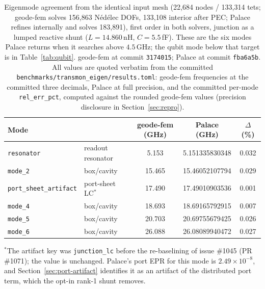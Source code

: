 \documentclass{anvil-paper}
\begin{document}
\begin{table}[t]
  \centering
  \caption{Eigenmode agreement from the identical input mesh (22{,}684
  nodes / 133{,}314 tets; geode-fem solves 156{,}863 N\'ed\'elec DOFs,
  133{,}108 interior after PEC; Palace refines internally and solves
  183{,}891), first order in both solvers, junction as a lumped reactive
  shunt ($L = 14.860$\,nH, $C = 5.5$\,fF). These are the six modes
  Palace returns when it searches above $4.5$\,GHz; the qubit mode below
  that target is in Table~\ref{tab:qubit}. geode-fem at commit
  \texttt{3174015}; Palace at commit \texttt{fba6a5b}. All values are
  quoted verbatim from the committed
  \texttt{benchmarks/transmon\_eigen/results.toml}: geode-fem frequencies
  at the committed three decimals, Palace at full precision, and the
  committed per-mode \texttt{rel\_err\_pct}, computed against the rounded
  geode-fem values (precision disclosure in Section~\ref{sec:repro}).}
  \label{tab:agreement}
  \small
  \begin{tabular}{@{}llccc@{}}
    \toprule
    Mode & & geode-fem (GHz) & Palace (GHz) & $\Delta$ (\%) \\
    \midrule
    \texttt{resonator} & readout resonator & 5.153 & 5.151335830348 & 0.032 \\
    \texttt{mode\_2} & box/cavity & 15.465 & 15.46052107794 & 0.029 \\
    \texttt{port\_sheet\_artifact} & port-sheet LC$^{\ast}$ & 17.490 & 17.49010903536 & 0.001 \\
    \texttt{mode\_4} & box/cavity & 18.693 & 18.69165792915 & 0.007 \\
    \texttt{mode\_5} & box/cavity & 20.703 & 20.69755679425 & 0.026 \\
    \texttt{mode\_6} & box/cavity & 26.088 & 26.08089940472 & 0.027 \\
    \bottomrule
  \end{tabular}

  \smallskip
  {\footnotesize $^{\ast}$The artifact key was \texttt{junction\_lc}
  before the re-baselining of issue \#1045 (PR \#1071); the value is
  unchanged. Palace's port EPR for this mode is $2.49\times10^{-8}$, and
  Section~\ref{sec:port-artifact} identifies it as an artifact of the
  distributed port term, which the opt-in rank-1 shunt removes.}
\end{table}
\end{document}
